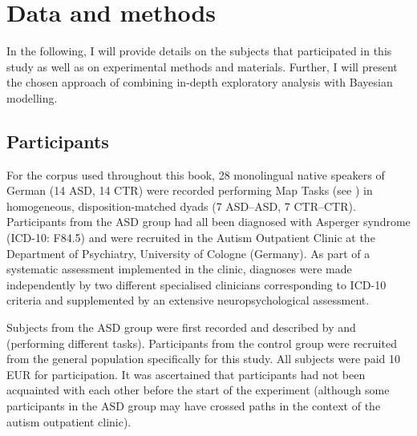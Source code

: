 	\chapter{Data and methods} \label{sec:data}
	
	In the following, I will provide details on the subjects that participated in this study as well as on experimental methods and materials. Further, I will present the chosen approach of combining in-depth exploratory analysis with Bayesian modelling.
	
	\section{Participants}\label{participants}

For the corpus used throughout this book, 28 monolingual native speakers of German (14 ASD, 14 CTR) were recorded performing Map Tasks (see ) in homogeneous, disposition-matched dyads (7 ASD--ASD, 7 CTR--CTR). Participants from the ASD group had all been diagnosed with Asperger syndrome (ICD-10: F84.5) and were recruited in the Autism Outpatient Clinic at the Department of Psychiatry, University of Cologne (Germany). As part of a systematic assessment implemented in the clinic, diagnoses were made independently by two different specialised clinicians corresponding to ICD-10 criteria and supplemented by an extensive neuropsychological assessment.

Subjects from the ASD group were first recorded and described by \citet{krugerProsodicDecodingEncoding2018} and \citet{krugerProsodicMarkingInformation2018} (performing different tasks). Participants from the control group were recruited from the general population specifically for this study. All subjects were paid 10 EUR for participation. It was ascertained that participants had not been acquainted with each other before the start of the experiment (although some participants in the ASD group may have crossed paths in the context of the autism outpatient clinic).

